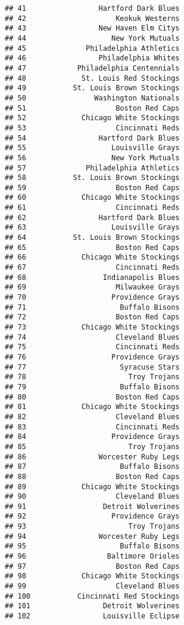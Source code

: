 \documentclass[]{article}
\begin{document}
\begin{verbatim}
## 41                 Hartford Dark Blues
## 42                     Keokuk Westerns
## 43                 New Haven Elm Citys
## 44                    New York Mutuals
## 45              Philadelphia Athletics
## 46                 Philadelphia Whites
## 47            Philadelphia Centennials
## 48             St. Louis Red Stockings
## 49           St. Louis Brown Stockings
## 50                Washington Nationals
## 51                     Boston Red Caps
## 52             Chicago White Stockings
## 53                     Cincinnati Reds
## 54                 Hartford Dark Blues
## 55                    Louisville Grays
## 56                    New York Mutuals
## 57              Philadelphia Athletics
## 58           St. Louis Brown Stockings
## 59                     Boston Red Caps
## 60             Chicago White Stockings
## 61                     Cincinnati Reds
## 62                 Hartford Dark Blues
## 63                    Louisville Grays
## 64           St. Louis Brown Stockings
## 65                     Boston Red Caps
## 66             Chicago White Stockings
## 67                     Cincinnati Reds
## 68                  Indianapolis Blues
## 69                     Milwaukee Grays
## 70                    Providence Grays
## 71                      Buffalo Bisons
## 72                     Boston Red Caps
## 73             Chicago White Stockings
## 74                     Cleveland Blues
## 75                     Cincinnati Reds
## 76                    Providence Grays
## 77                      Syracuse Stars
## 78                        Troy Trojans
## 79                      Buffalo Bisons
## 80                     Boston Red Caps
## 81             Chicago White Stockings
## 82                     Cleveland Blues
## 83                     Cincinnati Reds
## 84                    Providence Grays
## 85                        Troy Trojans
## 86                 Worcester Ruby Legs
## 87                      Buffalo Bisons
## 88                     Boston Red Caps
## 89             Chicago White Stockings
## 90                     Cleveland Blues
## 91                  Detroit Wolverines
## 92                    Providence Grays
## 93                        Troy Trojans
## 94                 Worcester Ruby Legs
## 95                      Buffalo Bisons
## 96                   Baltimore Orioles
## 97                     Boston Red Caps
## 98             Chicago White Stockings
## 99                     Cleveland Blues
## 100           Cincinnati Red Stockings
## 101                 Detroit Wolverines
## 102                 Louisville Eclipse

\end{verbatim}
\end{document}
